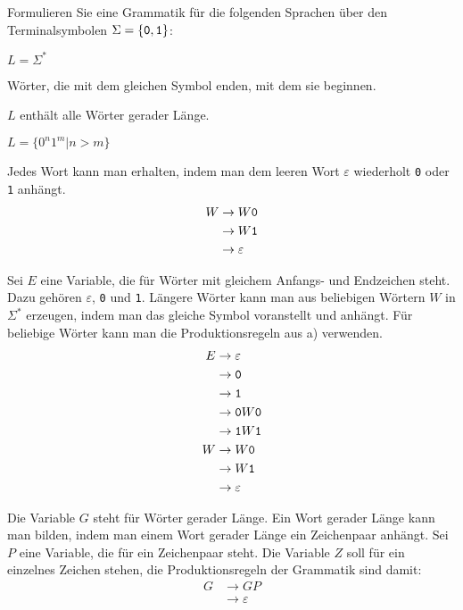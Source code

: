 Formulieren Sie eine Grammatik für die folgenden Sprachen über
den Terminalsymbolen $\Sigma=\{{\tt 0},{\tt 1}\}$:
\begin{teilaufgaben}
\item $L=\Sigma^*$
\item Wörter, die mit dem gleichen Symbol enden, mit dem sie beginnen.
\item $L$ enthält alle Wörter gerader Länge.
\item $L=\{0^n1^m|n>m\}$
\end{teilaufgaben}

\begin{loesung}
\begin{teilaufgaben}
\item
Jedes Wort kann man erhalten, indem man dem leeren Wort $\varepsilon$
wiederholt {\tt 0} oder {\tt 1} anhängt.
\begin{align*}
W&\rightarrow W{\tt 0}\\
 &\rightarrow W{\tt 1}\\
 &\rightarrow\varepsilon
\end{align*}
\item Sei $E$ eine Variable, die für Wörter mit gleichem Anfangs-
und Endzeichen steht. Dazu gehören $\varepsilon$, {\tt 0} und {\tt 1}.
Längere
Wörter kann man aus beliebigen Wörtern $W$ in $\Sigma^*$ erzeugen,
indem man das gleiche Symbol voranstellt und anhängt. Für beliebige
Wörter kann
man die Produktionsregeln aus a) verwenden.
\begin{align*}
E&\rightarrow \varepsilon\\
 &\rightarrow {\tt 0}\\
 &\rightarrow {\tt 1}\\
 &\rightarrow {\tt 0}W{\tt 0}\\
 &\rightarrow {\tt 1}W{\tt 1}\\
W&\rightarrow W{\tt 0}\\
 &\rightarrow W{\tt 1}\\
 &\rightarrow\varepsilon
\end{align*}
\item Die Variable $G$ steht für Wörter gerader Länge. Ein Wort
gerader Länge kann man bilden, indem man einem Wort gerader Länge
ein Zeichenpaar anhängt. Sei $P$ eine Variable, die für ein Zeichenpaar
steht. Die Variable $Z$ soll für ein einzelnes Zeichen stehen, die
Produktionsregeln der Grammatik sind damit:
\begin{align*}
G&\rightarrow GP\\
 &\rightarrow \varepsilon\\

\end{align*}
\end{teilaufgaben}
\end{loesung}
